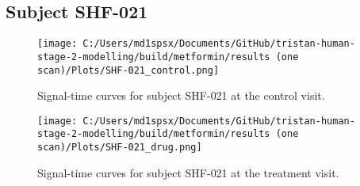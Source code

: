\documentclass{epflreport}%
\begin{document}
\subsection{Subject SHF{-}021}%
\label{subsec:SubjectSHF{-}021}%

%


\begin{figure}[h!]%
\centering%
\texttt{[image: C:/Users/md1spsx/Documents/GitHub/tristan-human-stage-2-modelling/build/metformin/results (one scan)/Plots/SHF-021\_control.png]}%
\caption{Signal{-}time curves for subject SHF{-}021 at the control visit.}%
\end{figure}

%


\begin{figure}[h!]%
\centering%
\texttt{[image: C:/Users/md1spsx/Documents/GitHub/tristan-human-stage-2-modelling/build/metformin/results (one scan)/Plots/SHF-021\_drug.png]}%
\caption{Signal{-}time curves for subject SHF{-}021 at the treatment visit.}%
\end{figure}
\end{document}
